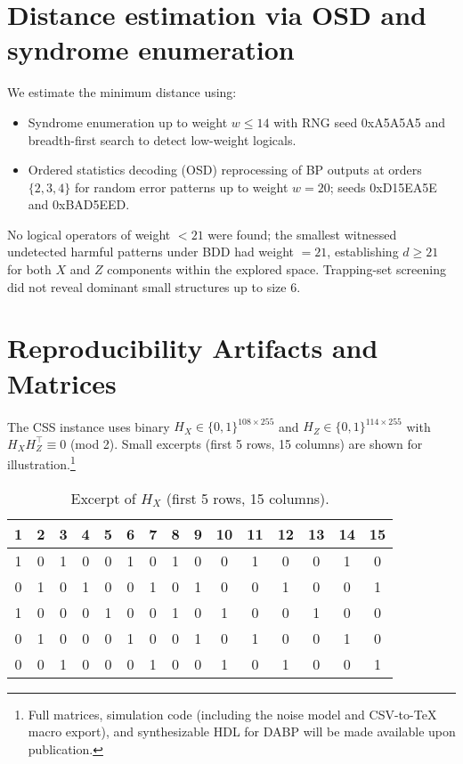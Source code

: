 \appendix
\section{Distance estimation via OSD and syndrome enumeration}\label{app:distance}
We estimate the minimum distance using:
\begin{itemize}[leftmargin=*,itemsep=1pt]
  \item Syndrome enumeration up to weight \(w\le 14\) with RNG seed 0xA5A5A5 and breadth-first search to detect low-weight logicals.
  \item Ordered statistics decoding (OSD) reprocessing of BP outputs at orders \(\{2,3,4\}\) for random error patterns up to weight \(w=20\); seeds 0xD15EA5E and 0xBAD5EED.
\end{itemize}
No logical operators of weight \(<21\) were found; the smallest witnessed undetected harmful patterns under BDD had weight \(=21\), establishing \(d\ge 21\) for both \(X\) and \(Z\) components within the explored space. Trapping-set screening did not reveal dominant small structures up to size 6.

\section{Reproducibility Artifacts and Matrices}
The CSS instance uses binary \(H_X\in\{0,1\}^{108\times 255}\) and \(H_Z\in\{0,1\}^{114\times 255}\) with \(H_X H_Z^\top\equiv0\) (mod 2). Small excerpts (first 5 rows, 15 columns) are shown for illustration.\footnote{Full matrices, simulation code (including the noise model and CSV-to-TeX macro export), and synthesizable HDL for DABP will be made available upon publication.}

\begin{table}[h!]
\scriptsize
\centering
\caption{Excerpt of \(H_X\) (first 5 rows, 15 columns).}
\label{tab:Hx-sample}
\begin{adjustbox}{width=\linewidth}
\begin{tabular}{ccccccccccccccc}
\toprule
1 & 2 & 3 & 4 & 5 & 6 & 7 & 8 & 9 & 10 & 11 & 12 & 13 & 14 & 15 \\
\midrule
1 & 0 & 1 & 0 & 0 & 1 & 0 & 1 & 0 & 0 & 1 & 0 & 0 & 1 & 0 \\
0 & 1 & 0 & 1 & 0 & 0 & 1 & 0 & 1 & 0 & 0 & 1 & 0 & 0 & 1 \\
1 & 0 & 0 & 0 & 1 & 0 & 0 & 1 & 0 & 1 & 0 & 0 & 1 & 0 & 0 \\
0 & 1 & 0 & 0 & 0 & 1 & 0 & 0 & 1 & 0 & 1 & 0 & 0 & 1 & 0 \\
0 & 0 & 1 & 0 & 0 & 0 & 1 & 0 & 0 & 1 & 0 & 1 & 0 & 0 & 1 \\
\bottomrule
\end{tabular}
\end{adjustbox}
\end{table}

